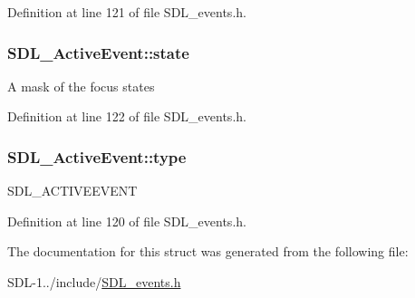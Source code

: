 Definition at line 121 of file S\+D\+L\+\_\+events.\+h.

\hypertarget{struct_s_d_l___active_event_af8f060502a9c906b25a4aa9c61f745f9}{}
\subsubsection[{state}]{ S\+D\+L\+\_\+\+Active\+Event\+::state}\label{struct_s_d_l___active_event_af8f060502a9c906b25a4aa9c61f745f9}
A mask of the focus states 

Definition at line 122 of file S\+D\+L\+\_\+events.\+h.

\hypertarget{struct_s_d_l___active_event_a4a719c0224f4c0079043432f540621c4}{}
\subsubsection[{type}]{ S\+D\+L\+\_\+\+Active\+Event\+::type}\label{struct_s_d_l___active_event_a4a719c0224f4c0079043432f540621c4}
S\+D\+L\+\_\+\+A\+C\+T\+I\+V\+E\+E\+V\+E\+N\+T 

Definition at line 120 of file S\+D\+L\+\_\+events.\+h.



The documentation for this struct was generated from the following file\+:\begin{DoxyCompactItemize}
\item 
S\+D\+L-\/1../include/\hyperlink{_s_d_l__events_8h}{S\+D\+L\+\_\+events.\+h}\end{DoxyCompactItemize}
